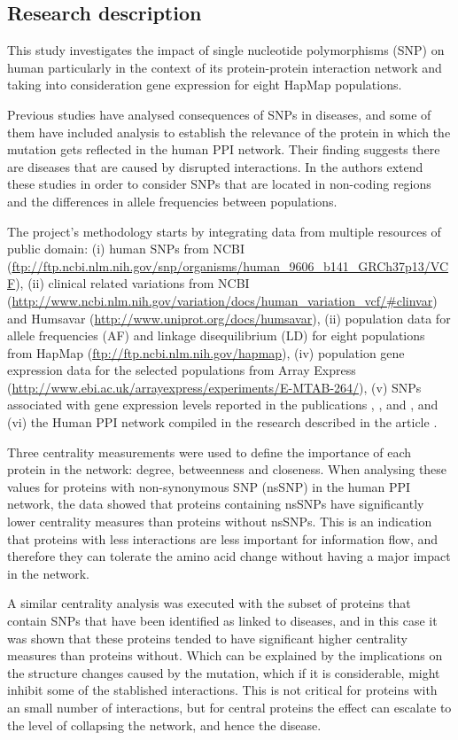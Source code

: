 \subsection{Research description}
This study investigates the impact of single nucleotide polymorphisms (SNP) on human particularly in the context of its protein-protein interaction network and taking into consideration gene expression for eight HapMap populations.

Previous studies have analysed consequences of SNPs in diseases, and some of them have included analysis to establish the relevance of the protein in which the mutation gets reflected in the human PPI network. Their finding suggests there are diseases that are caused by disrupted interactions. In \cite{HEE2014} the authors extend these studies in order to consider SNPs that are located in non-coding regions and the differences in allele frequencies between populations.

The project's methodology starts by integrating data from multiple resources of public domain: (i) human SNPs from NCBI (\url{ftp://ftp.ncbi.nlm.nih.gov/snp/organisms/human_9606_b141_GRCh37p13/VCF}), (ii) clinical related variations from NCBI (\url{http://www.ncbi.nlm.nih.gov/variation/docs/human_variation_vcf/#clinvar}) and Humsavar (\url{http://www.uniprot.org/docs/humsavar}), (ii) population data for allele frequencies (AF) and linkage disequilibrium (LD) for eight populations from HapMap (\url{ftp://ftp.ncbi.nlm.nih.gov/hapmap}), (iv) population gene expression data for the selected populations from Array Express (\url{http://www.ebi.ac.uk/arrayexpress/experiments/E-MTAB-264/}), (v) SNPs associated with gene expression levels reported in the publications \cite{STR2007}, \cite{LAP2013}, \cite{HAU2014} and \cite{WU2013}, and (vi) the Human PPI network compiled in the research described in the article \cite{RAP2013}.

Three centrality measurements were used to define the importance of each protein in the network: degree, betweenness and closeness. When analysing these values for proteins with non-synonymous SNP (nsSNP) in the human PPI network, the data showed that proteins containing nsSNPs have significantly lower centrality measures than proteins without nsSNPs. This is an indication that proteins with less interactions are less important for information flow, and therefore they can tolerate the amino acid change without having a major impact in the network.

A similar centrality analysis was executed with the subset of proteins that contain SNPs that have been identified as linked to diseases, and in this case it was shown that these proteins tended to have significant higher centrality measures than proteins without. Which can be explained by the implications on the structure changes caused by the mutation, which if it is considerable, might inhibit some of the stablished interactions. This is not  critical for proteins with an small number of interactions, but for central proteins the effect can escalate to the level of collapsing the network, and hence the disease.

